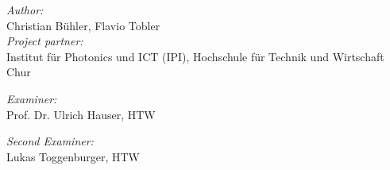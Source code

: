 \begin{titlepage}
\begin{center}
{\normalsize

\textit{Author:}\\
Christian Bühler, Flavio Tobler\\[35mm]



\textit{Project partner:}\\
Institut für Photonics und ICT (IPI), Hochschule für Technik und Wirtschaft Chur

\textit{Examiner:}\\
Prof. Dr. Ulrich Hauser, HTW

\textit{Second Examiner:}\\
Lukas Toggenburger, HTW

}
\end{center}
\end{titlepage}

\restoregeometry %

